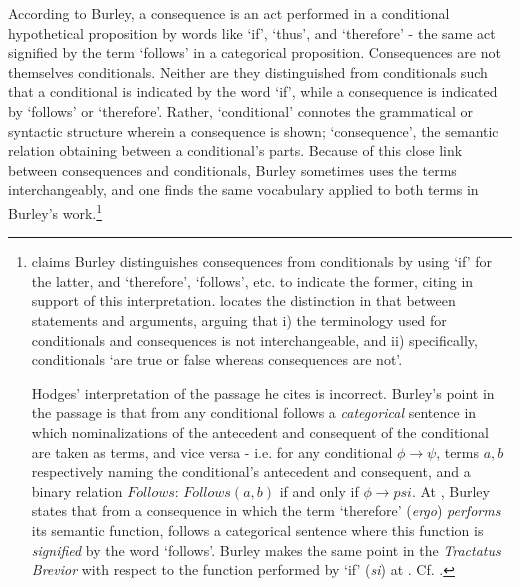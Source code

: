 \documentclass[]{article}
\begin{document}
According to Burley, a consequence is an act performed in a conditional hypothetical proposition by words like `if', `thus', and `therefore' - the same act signified by the term `follows' in a categorical proposition. Consequences are not themselves conditionals. Neither are they distinguished from conditionals such that a conditional is indicated by the word `if', while a consequence is indicated by `follows' or `therefore'. Rather, `conditional' connotes the grammatical or syntactic structure wherein a consequence is shown; `consequence', the semantic relation obtaining between a conditional's parts. Because of this close link between consequences and conditionals, Burley sometimes uses the terms interchangeably, and one finds the same vocabulary applied to both terms in Burley's work.\footnote{\cite{HodgesBurley} claims Burley distinguishes consequences from conditionals by using `if' for the latter, and `therefore', `follows', etc. to indicate the former, citing \cite[p. 78.10-20]{BurleyDPAL} in support of this interpretation. \cite[p. 120]{King2001} locates the distinction in that between statements and arguments, arguing that i) the terminology used for conditionals and consequences is not interchangeable, and ii) specifically, conditionals `are true or false whereas consequences are not'.
	
	Hodges' interpretation of the passage he cites is incorrect. Burley's point in the passage is that from any conditional follows a \textit{categorical} sentence in which nominalizations of the antecedent and consequent of the conditional are taken as terms, and vice versa - i.e. for any conditional $\phi \rightarrow \psi$, terms $a, b$ respectively naming the conditional's antecedent and consequent, and a binary relation $Follows$: $Follows(a, b)$ if and only if $\phi \rightarrow psi$. At \cite[p. 141.26-30]{BurleyDPAL}, Burley states that from a consequence in which the term `therefore' (\textit{ergo}) \textit{performs} its semantic function, follows a categorical sentence where this function is \textit{signified} by the word `follows'. Burley makes the same point in the \textit{Tractatus Brevior} with respect to the function performed by `if' (\textit{si}) at \cite[p. 219.1-9]{BurleyDPAL}. Cf. \cite[p. 143, par. 119]{Green-Pedersen1980b}.
	
}
\end{document}
